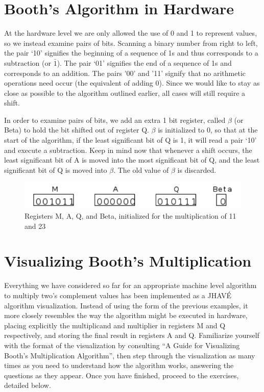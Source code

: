 \documentclass{article}
\begin{document}

\section{Booth's Algorithm in Hardware}
    At the hardware level we are only allowed the use of 0 and 1 to represent values, so we instead examine pairs of bits.
Scanning a binary number from right to left, the pair `10' signifies the beginning of a sequence of 1s and thus corresponds to a subtraction (or $\bar{1}$).
The pair `01' signifies the end of a sequence of 1s and corresponds to an addition.
The pairs '00' and '11' signify that no arithmetic operations need occur (the equivalent of adding 0).
Since we would like to stay as close as possible to the algorithm outlined earlier, all cases will still require a shift.

    In order to examine pairs of bits, we add an extra 1 bit register, called $\beta$ (or Beta) to hold the bit shifted out of register Q.
$\beta$ is initialized to 0, so that at the start of the algorithm, if the least significant bit of Q is 1, it will read a pair `10' and execute a subtraction.
Keep in mind now that whenever a shift occurs, the least significant bit of A is moved into the most significant bit of Q, and the least significant bit of Q is moved into $\beta$.
The old value of $\beta$ is discarded.

\begin{figure}[h]
\centering
\includegraphics{init2.pdf}
\caption{Registers M, A, Q, and Beta, initialized for the multiplication of 11 and 23}
\end{figure}

\section{Visualizing Booth's Multiplication}
Everything we have considered so far for an appropriate machine level algorithm to multiply two's complement values has been implemented as a JHAVÉ algorithm visualization.
Instead of using the form of the previous examples, it more closely resembles the way the algorithm might be executed in hardware, placing explicitly the multiplicand and multiplier in registers M and Q respectively, and storing the final result in registers A and Q.
Familiarize yourself with the format of the visualization by consulting ``A Guide for Visualizing Booth’s Multiplication Algorithm'', then step through the visualization as many times as you need to understand how the algorithm works, answering the questions as they appear.
Once you have finished, proceed to the exercises, detailed below.
\end{document}
